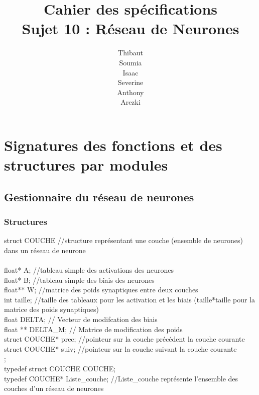 \documentclass{article}
\begin{document}
\maketitle
\newpage
\title{Cahier des spécifications\\Sujet 10 : Réseau de Neurones}
\author{Thibaut \\Soumia {}\\Isaac {}\\Severine {}\\Anthony {}\\Arezki {}}

\section{Signatures des fonctions et des structures par modules}
	\subsection{Gestionnaire du réseau de neurones}
		\subsubsection{Structures}
			struct COUCHE	//structure représentant une couche (ensemble de neurones) dans un réseau de neurone\\
			{\\
				float* A;	//tableau simple des activations des neurones\\
				float* B;	//tableau simple des biais des neurones\\
				float** W;	//matrice des poids synaptiques entre deux couches\\
				int taille;	//taille des tableaux pour les activation et les biais (taille*taille pour la matrice des poids synaptiques)\\
				
				float DELTA;      // Vecteur de modifcation des biais\\
				float ** DELTA_M; // Matrice de modification des poids\\
				
				struct COUCHE* prec;	//pointeur sur la couche précédent la couche courante\\
				struct COUCHE* suiv;	//pointeur sur la couche suivant la couche courante\\
			};\\
			typedef struct COUCHE COUCHE;\\
			typedef COUCHE* Liste_couche;	//Liste_couche représente l'ensemble des couches d'un réseau de neurones\\
			
\end{document}
